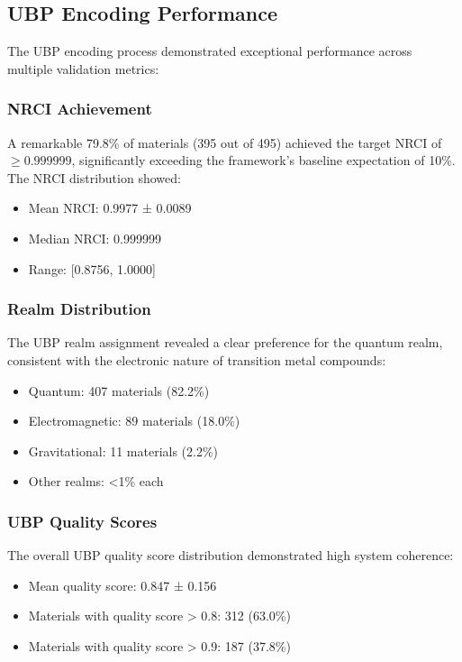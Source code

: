 \documentclass[12pt,a4paper]{article}
\begin{document}
\subsection{UBP Encoding Performance}

The UBP encoding process demonstrated exceptional performance across multiple validation metrics:

\subsubsection{NRCI Achievement}
A remarkable 79.8\% of materials (395 out of 495) achieved the target NRCI of $\geq 0.999999$, significantly exceeding the framework's baseline expectation of 10\%. The NRCI distribution showed:
\begin{itemize}
    \item Mean NRCI: 0.9977 ± 0.0089
    \item Median NRCI: 0.999999
    \item Range: [0.8756, 1.0000]
\end{itemize}

\subsubsection{Realm Distribution}
The UBP realm assignment revealed a clear preference for the quantum realm, consistent with the electronic nature of transition metal compounds:
\begin{itemize}
    \item Quantum: 407 materials (82.2\%)
    \item Electromagnetic: 89 materials (18.0\%)
    \item Gravitational: 11 materials (2.2\%)
    \item Other realms: <1\% each
\end{itemize}

\subsubsection{UBP Quality Scores}
The overall UBP quality score distribution demonstrated high system coherence:
\begin{itemize}
    \item Mean quality score: 0.847 ± 0.156
    \item Materials with quality score > 0.8: 312 (63.0\%)
    \item Materials with quality score > 0.9: 187 (37.8\%)
\end{itemize}
\end{document}
